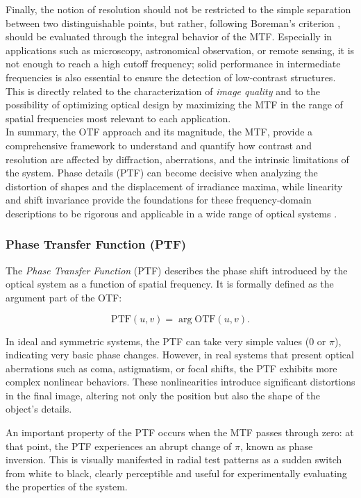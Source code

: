 Finally, the notion of resolution should not be restricted to the simple separation between two distinguishable points, but rather, following Boreman's criterion \cite{Boreman2001ModulationTT52}, should be evaluated through the integral behavior of the MTF. Especially in applications such as microscopy, astronomical observation, or remote sensing, it is not enough to reach a high cutoff frequency; solid performance in intermediate frequencies is also essential to ensure the detection of low-contrast structures. This is directly related to the characterization of \textit{image quality} and to the possibility of optimizing optical design by maximizing the MTF in the range of spatial frequencies most relevant to each application.\\

In summary, the OTF approach and its magnitude, the MTF, provide a comprehensive framework to understand and quantify how contrast and resolution are affected by diffraction, aberrations, and the intrinsic limitations of the system. Phase details (PTF) can become decisive when analyzing the distortion of shapes and the displacement of irradiance maxima, while linearity and shift invariance provide the foundations for these frequency-domain descriptions to be rigorous and applicable in a wide range of optical systems \cite{Boreman2001ModulationTT52}.\\

\subsubsection{Phase Transfer Function (PTF)}

The \textit{Phase Transfer Function} (PTF) describes the phase shift introduced by the optical system as a function of spatial frequency. It is formally defined as the argument part of the OTF:

\begin{equation}
\text{PTF}(u,v) = \arg{\text{OTF}(u,v)}.
\end{equation}

In ideal and symmetric systems, the PTF can take very simple values (0 or $\pi$), indicating very basic phase changes. However, in real systems that present optical aberrations such as coma, astigmatism, or focal shifts, the PTF exhibits more complex nonlinear behaviors. These nonlinearities introduce significant distortions in the final image, altering not only the position but also the shape of the object’s details.

An important property of the PTF occurs when the MTF passes through zero: at that point, the PTF experiences an abrupt change of $\pi$, known as phase inversion. This is visually manifested in radial test patterns as a sudden switch from white to black, clearly perceptible and useful for experimentally evaluating the properties of the system.

